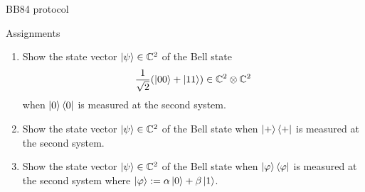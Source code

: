 \documentclass[10pt]{beamer}
\begin{document}
\begin{frame}{BB84 protocol}
\end{frame}
\fi

\begin{frame}{Assignments}
\begin{enumerate}
\setlength{\itemsep}{2em}
\item Show the state vector $\ket{\psi}\in \mathbb{C}^2$ of the Bell state
\begin{equation*}
\frac1{\sqrt{2}}(\ket{00}+\ket{11}) \in \mathbb{C}^2\otimes \mathbb{C}^2
\end{equation*}
when $\ket{0}\bra{0}$ is measured at the second system.
\item Show the state vector $\ket{\psi}\in \mathbb{C}^2$ of the Bell state
when $\ket{+}\bra{+}$ is measured at the second system.
\item Show the state vector $\ket{\psi}\in \mathbb{C}^2$ of the Bell state
when $\ket{\varphi}\bra{\varphi}$ is measured at the second system where $\ket{\varphi}:=\alpha\ket{0}+\beta\ket{1}$.
\end{enumerate}
\end{frame}
\end{document}
